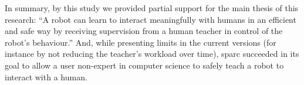 In summary, by this study we provided partial support for the main thesis of this research: ``A robot can learn to interact meaningfully with humans in an efficient and safe way by receiving supervision from a human teacher in control of the robot's behaviour.'' And, while presenting limits in the current versions (for instance by not reducing the teacher's workload over time), \gls{sparc} succeeded in its goal to allow a user non-expert in computer science to safely teach a robot to interact with a human. 